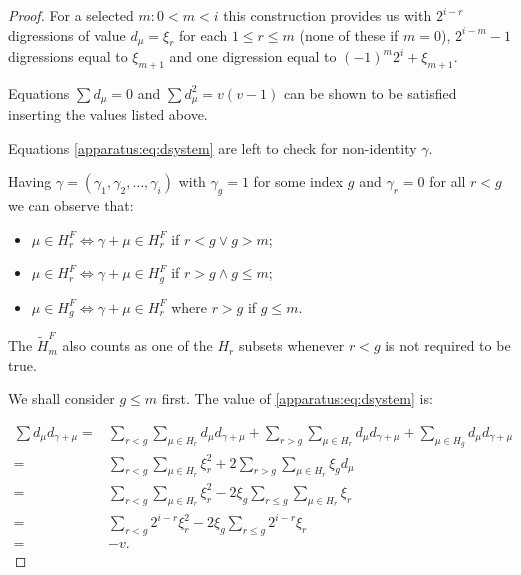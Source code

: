 \begin{proof}
	For a selected $m \colon 0 < m < i$ this construction provides us with $2^{i-r}$ digressions of value $d_\mu=\xi_r$ for each $1 \leq r\leq m$ (none of these if $m=0$), $2^{i-m}-1$ digressions equal to $\xi_{m+1}$ and one digression equal to $(-1)^m 2^i+\xi_{m+1}$.
    
    Equations $\sum d_\mu = 0$ and $\sum d_\mu^2 = v(v-1)$ can be shown to be satisfied inserting the values listed above.
    
    Equations \eqref{apparatus:eq:dsystem} are left to check for non-identity $\gamma$.
    
    Having $\gamma = (\gamma_1, \gamma_2, \ldots, \gamma_i)$ with $\gamma_g = 1$ for some index $g$ and $\gamma_r = 0$ for all $r < g$ we can observe that:
    \begin{itemize}
        \item $\mu \in H_r^F \iff \gamma + \mu \in H_r^F$ if $r < g \lor g > m$;
        \item $\mu \in H_r^F \iff \gamma + \mu \in H_g^F$ if $r > g \land g \leq m$;
        \item $\mu \in H_g^F \iff \gamma + \mu \in H_r^F$ where $r>g$ if $g \leq m$.
    \end{itemize}
    
    The $\widetilde H_m^F$ also counts as one of the $H_r$ subsets whenever $r<g$ is not required to be true.
    
    We shall consider $g\leq m$ first. The value of \eqref{apparatus:eq:dsystem} is:
    
    \begin{equation}
        \begin{split}
            \sum d_\mu d_{\gamma+\mu}
              = & \sum\limits_{r<g} \sum\limits_{\mu \in H_r} d_\mu d_{\gamma + \mu}
                + \sum\limits_{r>g} \sum\limits_{\mu \in H_r} d_\mu d_{\gamma + \mu}
                + \sum\limits_{\mu \in H_g} d_\mu d_{\gamma + \mu} \\
              = & \sum\limits_{r<g} \sum\limits_{\mu \in H_r} \xi_r^2
                + 2\sum\limits_{r>g} \sum\limits_{\mu \in H_r} \xi_g d_\mu \\
              = & \sum\limits_{r<g} \sum\limits_{\mu \in H_r} \xi_r^2
                - 2 \xi_g \sum\limits_{r \leq g} \sum\limits_{\mu \in H_r} \xi_r \\
              = & \sum\limits_{r<g} 2^{i-r} \xi_r^2
                - 2 \xi_g \sum\limits_{r \leq g}  2^{i-r} \xi_r \\
              = & - v.
        \end{split}
    \end{equation}
    

\end{proof}
